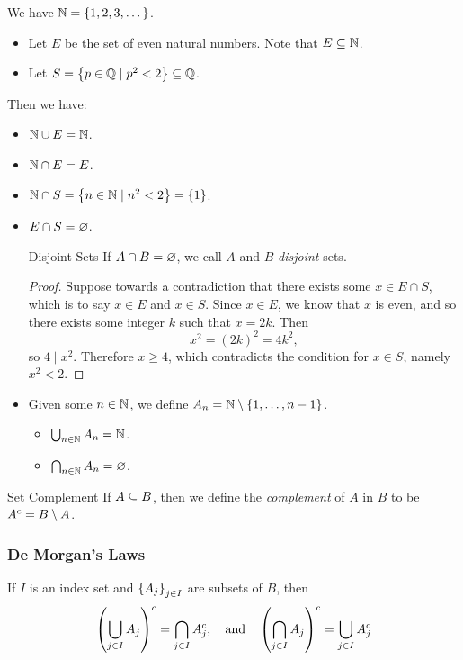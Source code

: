 \documentclass[class=article, crop=false]{standalone}
\begin{document}
  \begin{example}{}
    We have $\mathbb{N} = \left\{1, 2, 3, \dotsc\right\}$.
    \begin{itemize}
      \item Let $E$ be the set of even natural numbers. Note that $E\subseteq \mathbb{N}$.
      \item Let $S = \left\{p\in \mathbb{Q}\mid p^2 < 2\right\}\subseteq \mathbb{Q}$.
    \end{itemize}
    Then we have:
    \begin{itemize}
      \item $\mathbb{N}\cup E = \mathbb{N}$.
      \item $\mathbb{N}\cap E = E$.
      \item $\mathbb{N}\cap S = \left\{n\in \mathbb{N}\mid n^2 < 2\right\} = \left\{1\right\}$.
      \item $E\cap S = \varnothing$.
      \begin{definition}{Disjoint Sets}
        If $A\cap B = \varnothing$, we call $A$ and $B$ \emph{disjoint} sets.
      \end{definition}
      \begin{proof}
        Suppose towards a contradiction that there exists some $x\in E\cap S$, which is to say $x\in E$ and $x\in S$. Since $x\in E$, we know that $x$ is even, and so there exists some integer $k$ such that $x = 2k$. Then
        \[
          x^2 = (2k)^2 = 4k^2,
        \]
        so $4\mid x^2$. Therefore $x\geq 4$, which contradicts the condition for $x\in S$, namely $x^2 < 2$.
      \end{proof}
      \item Given some $n\in \mathbb{N}$, we define $A_n = \mathbb{N}\setminus \left\{1,\dotsc,n - 1\right\}$.
      \begin{itemize}
        \item $\bigcup_{n\in \mathbb{N}} A_n = \mathbb{N}$.
        \item $\bigcap_{n\in \mathbb{N}} A_n = \varnothing$.
      \end{itemize}
    \end{itemize}
  \end{example}
  \begin{definition}{Set Complement}
    If $A\subseteq B$, then we define the \emph{complement} of $A$ in $B$ to be $A^c = B\setminus A$.
  \end{definition}
  \subsubsection{De Morgan's Laws}
  If $I$ is an index set and $\left\{A_j\right\}_{j\in I}$ are subsets of $B$, then
  \[
    \left( \bigcup_{j\in I}A_j \right)^c = \bigcap_{j\in I}A_j^c, \quad\text{and}\quad \left( \bigcap_{j\in I}A_j \right)^c = \bigcup_{j\in I}A_j^c
  \]
\end{document}
